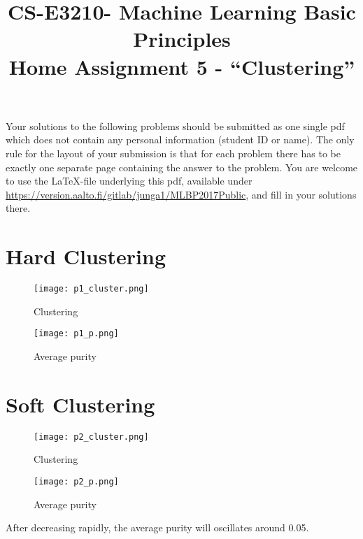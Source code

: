 \documentclass[article,11pt]{article}
\title{CS-E3210- Machine Learning Basic Principles \\ Home Assignment 5 - ``Clustering''}
\begin{document}
\date{}
\maketitle

Your solutions to the following problems should be submitted as one single pdf which does not contain 
any personal information (student ID or name).  The only rule for the layout of your submission is that for each 
problem there has to be exactly one separate page containing the answer to the problem. You are welcome to use the \LaTeX-file underlying this pdf, 
available under \url{https://version.aalto.fi/gitlab/junga1/MLBP2017Public}, and fill in your solutions there. 

\newpage

\section{Hard Clustering}
\begin{figure}[H]
	\begin{center}
		\texttt{[image: p1\_cluster.png]}
	\end{center}
	\caption{Clustering}
\end{figure}
\begin{figure}[H]
	\begin{center}
		\texttt{[image: p1\_p.png]}
	\end{center}
	\caption{Average purity}
\end{figure}
\newpage

\section{Soft Clustering}
\begin{figure}[H]
	\begin{center}
		\texttt{[image: p2\_cluster.png]}
	\end{center}
	\caption{Clustering}
\end{figure}
\begin{figure}[H]
	\begin{center}
		\texttt{[image: p2\_p.png]}
	\end{center}
	\caption{Average purity}
\end{figure}
After decreasing rapidly, the average purity will oscillates around 0.05.
\end{document}
